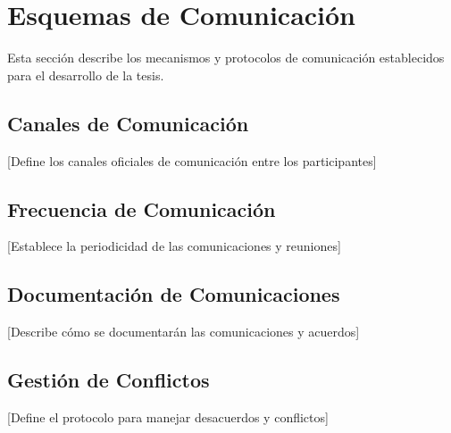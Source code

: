 \section{Esquemas de Comunicación}

Esta sección describe los mecanismos y protocolos de comunicación establecidos para el desarrollo de la tesis.

\subsection{Canales de Comunicación}
[Define los canales oficiales de comunicación entre los participantes]

\subsection{Frecuencia de Comunicación}
[Establece la periodicidad de las comunicaciones y reuniones]

\subsection{Documentación de Comunicaciones}
[Describe cómo se documentarán las comunicaciones y acuerdos]

\subsection{Gestión de Conflictos}
[Define el protocolo para manejar desacuerdos y conflictos]